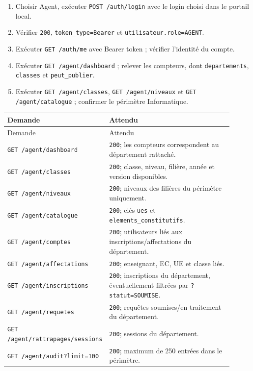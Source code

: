 \documentclass[10pt,a4paper]{article}
\newcommand{\method}[1]{\texttt{\small #1}}
\begin{document}
\begin{enumerate}
\item Choisir Agent, exécuter \method{POST /auth/login} avec le login choisi dans le portail local.
\item Vérifier \texttt{200}, \texttt{token\_type=Bearer} et \texttt{utilisateur.role=AGENT}.
\item Exécuter \method{GET /auth/me} avec Bearer token ; vérifier l’identité du compte.
\item Exécuter \method{GET /agent/dashboard} ; relever les compteurs, dont \texttt{departements}, \texttt{classes} et \texttt{peut\_publier}.
\item Exécuter \method{GET /agent/classes}, \method{GET /agent/niveaux} et \method{GET /agent/catalogue} ; confirmer le périmètre Informatique.
\end{enumerate}

\begin{longtable}{p{0.33\linewidth}p{0.58\linewidth}}
\toprule
Demande & Attendu \\
\midrule
\endfirsthead
\toprule Demande & Attendu \\\midrule
\endhead
\method{GET /agent/dashboard} & \texttt{200}; les compteurs correspondent au département rattaché. \\
\method{GET /agent/classes} & \texttt{200}; classe, niveau, filière, année et version disponibles. \\
\method{GET /agent/niveaux} & \texttt{200}; niveaux des filières du périmètre uniquement. \\
\method{GET /agent/catalogue} & \texttt{200}; clés \texttt{ues} et \texttt{elements\_constitutifs}. \\
\method{GET /agent/comptes} & \texttt{200}; utilisateurs liés aux inscriptions/affectations du département. \\
\method{GET /agent/affectations} & \texttt{200}; enseignant, EC, UE et classe liés. \\
\method{GET /agent/inscriptions} & \texttt{200}; inscriptions du département, éventuellement filtrées par \texttt{?statut=SOUMISE}. \\
\method{GET /agent/requetes} & \texttt{200}; requêtes soumises/en traitement du département. \\
\method{GET /agent/rattrapages/sessions} & \texttt{200}; sessions du département. \\
\method{GET /agent/audit?limit=100} & \texttt{200}; maximum de 250 entrées dans le périmètre. \\
\bottomrule
\end{longtable}
\end{document}
